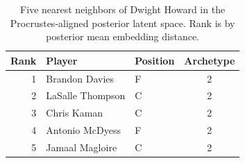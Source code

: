 \begin{table}[htbp]
  \centering\small
  \begin{tabular}{rllc}
    \toprule
    Rank & Player & Position & Archetype \\
    \midrule
    1 & Brandon Davies & F & 2 \\
    2 & LaSalle Thompson & C & 2 \\
    3 & Chris Kaman & C & 2 \\
    4 & Antonio McDyess & F & 2 \\
    5 & Jamaal Magloire & C & 2 \\
    \bottomrule
  \end{tabular}
  \caption{Five nearest neighbors of Dwight Howard in the Procrustes-aligned posterior latent space. Rank is by posterior mean embedding distance.}
  \label{tab:Dwight_Howard_neighbors}
\end{table}

